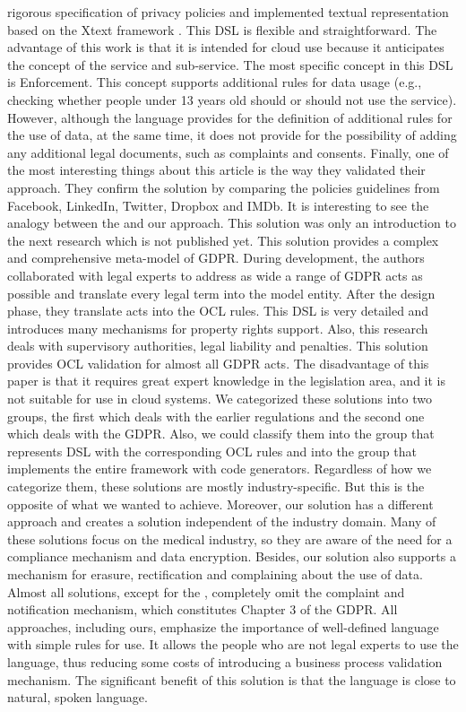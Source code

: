\documentclass[11pt,english]{article}
\begin{document}
rigorous specification of privacy policies and implemented textual representation based on the Xtext framework \cite{bettini2016implementing}. This DSL is flexible and straightforward. The advantage of this work is that it is intended for cloud use because it anticipates the concept of the service and sub-service. The most specific concept in this DSL is Enforcement. This concept supports additional rules for data usage (e.g., checking whether people under 13 years old should or should not use the service). However, although the language provides for the definition of additional rules for the use of data, at the same time, it does not provide for the possibility of adding any additional legal documents, such as complaints and consents. Finally, one of the most interesting things about this article is the way they validated their approach. They confirm the solution by comparing the policies guidelines from Facebook, LinkedIn, Twitter, Dropbox and IMDb. \newline It is interesting to see the analogy between the \cite{torre2019using} and our approach. This solution was only an introduction to the next research  \cite{modeldrivengdpr} which is not published yet. This solution provides a complex and comprehensive meta-model of GDPR. During development, the authors collaborated with legal experts to address as wide a range of GDPR acts as possible and translate every legal term into the model entity. After the design phase, they translate acts into the OCL rules. This DSL is very detailed and introduces many mechanisms for property rights support. Also, this research deals with supervisory authorities, legal liability and penalties. This solution provides OCL validation for almost all GDPR acts. The disadvantage of this paper is that it requires great expert knowledge in the legislation area, and it is not suitable for use in cloud systems. \newline We categorized these solutions into two groups, the first which deals with the earlier regulations and the second one which deals with the GDPR. Also, we could classify them into the group that represents DSL with the corresponding OCL rules and into the group that implements the entire framework with code generators. Regardless of how we categorize them, these solutions are mostly industry-specific. But this is the opposite of what we wanted to achieve. Moreover, our solution has a different approach and creates a solution independent of the industry domain. Many of these solutions focus on the medical industry, so they are aware of the need for a compliance mechanism and data encryption. Besides, our solution also supports a mechanism for erasure, rectification and complaining about the use of data. Almost all solutions, except for the \cite{torre2019using}, completely omit the complaint and notification mechanism, which constitutes Chapter 3 of the GDPR. All approaches, including ours, emphasize the importance of well-defined language with simple rules for use. It allows the people who are not legal experts to use the language, thus reducing some costs of introducing a business process validation mechanism. The significant benefit of this solution is that the language is close to natural, spoken language.
\end{document}
